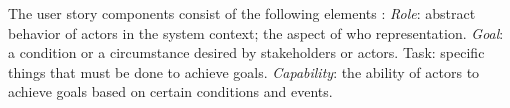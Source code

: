 The user story components consist of the following elements \cite{wautelet2017user} : \emph{Role}: abstract behavior of actors in the system context; the aspect of who representation. \emph{Goal}: a condition or a circumstance desired by stakeholders or actors. Task: speciﬁc things that must be done to achieve goals. \emph{Capability}: the ability of actors to achieve goals based on certain conditions and events.
